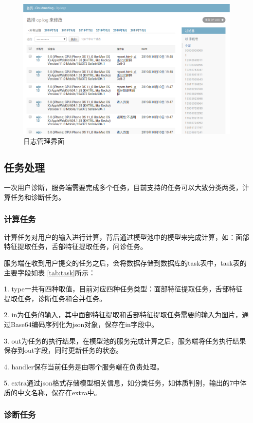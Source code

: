 \begin{figure}[ht]
    \centering
    \includegraphics[width=15cm]{images/op_log.png}
    \caption{日志管理界面}
    \label{fig:op_log}
\end{figure}

\subsection{任务处理}
一次用户诊断，服务端需要完成多个任务，目前支持的任务可以大致分类两类，计算任务和诊断任务。


\subsubsection{计算任务}
计算任务对用户的输入进行计算，背后通过模型池中的模型来完成计算，如：面部特征提取任务，舌部特征提取任务，问诊任务。

服务端在收到用户提交的任务之后，会将数据存储到数据库的task表中，task表的主要字段如表 \ref{tab:task}所示：

1. type一共有四种取值，目前对应四种任务类型：面部特征提取任务，舌部特征提取任务，诊断任务和合并任务。

2. in为任务的输入，其中面部特征提取和舌部特征提取任务需要的输入为图片，通过Base64编码序列化为json对象，保存在in字段中。

3. out为任务的执行结果，在模型池的服务完成计算之后，服务端将任务执行结果保存到out字段，同时更新任务的状态。

4. handler保存当前任务是由哪个服务端在负责处理。

5. extra通过json格式存储模型相关信息，如分类任务，如体质判别，输出的7中体质的中文名称，保存在extra中。


\subsubsection{诊断任务}

